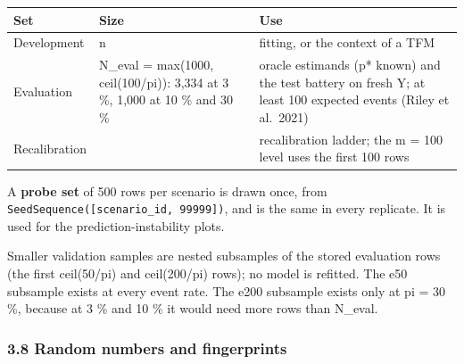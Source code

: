 \documentclass[
  10pt,
]{article}
\newcounter{none} %
\begin{document}
{\def\LTcaptype{none} %
\begin{longtable}[]{@{}
  >{\raggedright\arraybackslash}p{}
  >{\raggedright\arraybackslash}p{}
  >{\raggedright\arraybackslash}p{}@{}}
\toprule\noalign{}
\begin{minipage}[b]{\linewidth}\raggedright
Set
\end{minipage} & \begin{minipage}[b]{\linewidth}\raggedright
Size
\end{minipage} & \begin{minipage}[b]{\linewidth}\raggedright
Use
\end{minipage} \\
\midrule\noalign{}
\endhead
\bottomrule\noalign{}
\endlastfoot
Development & n & fitting, or the context of a TFM \\
Evaluation & N\_eval = max(1000, ceil(100/pi)): 3,334 at 3
\%, 1,000 at 10 \% and 30 \% & oracle estimands (p* known)
and the test battery on fresh Y; at least 100 expected
events (Riley et al.~2021) \\
Recalibration & 500 & recalibration ladder; the m = 100
level uses the first 100 rows \\
\end{longtable}
}

A \textbf{probe set} of 500 rows per scenario is drawn once,
from \texttt{SeedSequence({[}scenario\_id,\ 99999{]})}, and
is the same in every replicate. It is used for the
prediction-instability plots.

Smaller validation samples are nested subsamples of the
stored evaluation rows (the first ceil(50/pi) and
ceil(200/pi) rows); no model is refitted. The e50 subsample
exists at every event rate. The e200 subsample exists only
at pi = 30 \%, because at 3 \% and 10 \% it would need more
rows than N\_eval.

\subsubsection{3.8 Random numbers and
fingerprints}\label{random-numbers-and-fingerprints}
\end{document}

